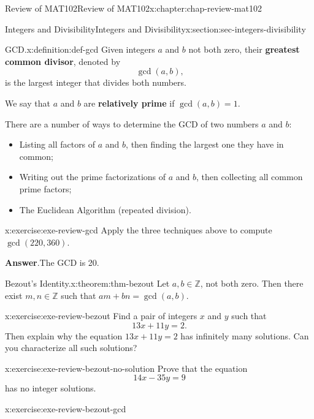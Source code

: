 \documentclass[oneside,10pt,]{book}
\newcommand{\blocktitlefont}{\relax}
\newcommand{\terminology}[1]{\textbf{#1}}
\numberwithin{equation}{section}
\begin{document}
\begin{chapterptx}{Review of MAT102}{}{Review of MAT102}{}{}{x:chapter:chap-review-mat102}
\begin{sectionptx}{Integers and Divisibility}{}{Integers and Divisibility}{}{}{x:section:sec-integers-divisibility}
\begin{definition}{GCD.}{x:definition:def-gcd}
Given integers \(a\) and \(b\) not both zero, their \terminology{greatest common divisor}, denoted by%
\begin{equation*}
\gcd(a,b)\text{,}
\end{equation*}
is the largest integer that divides both numbers.%
\par
We say that \(a\) and \(b\) are \terminology{relatively prime} if \(\gcd(a,b) = 1\).%
\end{definition}
There are a number of ways to determine the GCD of two numbers \(a\) and \(b\):%
\begin{itemize}[label=\textbullet]
\item{}Listing all factors of \(a\) and \(b\), then finding the largest one they have in common;%
\item{}Writing out the prime factorizations of \(a\) and \(b\), then collecting all common prime factors;%
\item{}The Euclidean Algorithm (repeated division).%
\end{itemize}
%
\begin{inlineexercise}{}{x:exercise:exe-review-gcd}%
Apply the three techniques above to compute \(\gcd(220,360)\).%
\par\smallskip%
\noindent\textbf{\blocktitlefont Answer}.\hypertarget{g:answer:id247852}{}\quad{}The GCD is 20.%
\end{inlineexercise}
\begin{theorem}{Bezout's Identity.}{}{x:theorem:thm-bezout}%
Let \(a,b \in \mathbb{Z}\), not both zero. Then there exist \(m,n \in \mathbb{Z}\) such that \(am + bn = \gcd(a,b)\).%
\end{theorem}
\begin{inlineexercise}{}{x:exercise:exe-review-bezout}%
Find a pair of integers \(x\) and \(y\) such that%
\begin{equation*}
13x + 11y = 2\text{.}
\end{equation*}
Then explain why the equation \(13x + 11y = 2\) has infinitely many solutions. Can you characterize all such solutions?%
\end{inlineexercise}
\begin{inlineexercise}{}{x:exercise:exe-review-bezout-no-solution}%
Prove that the equation%
\begin{equation*}
14x - 35y = 9
\end{equation*}
has no integer solutions.%
\end{inlineexercise}
\begin{inlineexercise}{}{x:exercise:exe-review-bezout-gcd}%

\end{inlineexercise}
\end{sectionptx}
\end{chapterptx}
\end{document}
